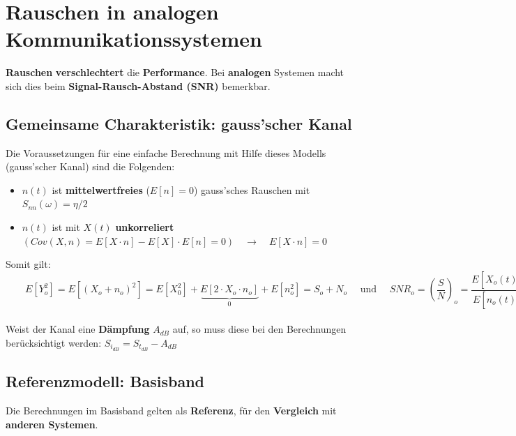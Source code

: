 \section{Rauschen in analogen Kommunikationssystemen }
\textbf{Rauschen} \textbf{verschlechtert} die \textbf{Performance}. Bei \textbf{analogen} Systemen
macht sich dies beim \textbf{Signal-Rausch-Abstand (SNR)} bemerkbar.
\subsection{Gemeinsame Charakteristik: gauss'scher Kanal }
\begin{figure}[!ht]
\begin{center}
	
\end{center}
\end{figure}

Die Voraussetzungen für eine einfache Berechnung mit Hilfe dieses Modells (gauss'scher Kanal)
sind die Folgenden:
\begin{itemize}
  \item $n(t)$ ist \textbf{mittelwertfreies} ($E[n] = 0$) gauss'sches Rauschen mit $S_{nn}(\omega) = \eta/2$
  \item $n(t)$ ist mit $X \left( t \right)$ \textbf{unkorreliert} $\left( Cov
  \left(X,n \right) = E \left[ X \cdot n \right] - E \left[ X \right] \cdot E
  \left[ n \right] = 0 \right) \quad \rightarrow \quad E[X\cdot n] = 0$
\end{itemize}
Somit gilt: $ \qquad E[Y_o^2]= E[(X_o + n_o)^2] = E[X_0^2] + \underbrace{E[2 \cdot X_o \cdot n_o]}_0 + E[n_o^2] = S_o + N_o
\quad \text{ und } \quad SNR_o = \left(\dfrac{S}{N}\right)_o = \dfrac{E[X_o(t)^2]}{E[n_o(t)^2]}$ \\ \\
Weist der Kanal eine \textbf{Dämpfung} $A_{dB}$ auf, so muss diese bei den Berechnungen berücksichtigt
werden: $S_{i_{dB}} = S_{t_{dB}} - A_{dB}$



\subsection{Referenzmodell: Basisband }
Die Berechnungen im Basisband gelten als \textbf{Referenz}, für den \textbf{Vergleich} mit
\textbf{anderen Systemen}. \\

\begin{figure}[!ht]
\begin{center}
	
\end{center}
\end{figure}

